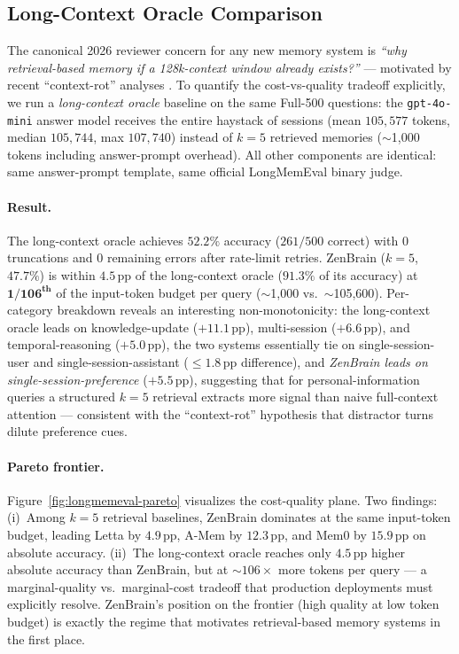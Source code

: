 \documentclass{article}
\begin{document}
\subsection{Long-Context Oracle Comparison}
\label{app:longmemeval-long-context}

The canonical 2026 reviewer concern for any new memory system is
\emph{``why retrieval-based memory if a 128k-context window already
exists?''} --- motivated by recent ``context-rot'' analyses
\citep{he2026memoryarena, yan2025gam}. To quantify the cost-vs-quality
tradeoff explicitly, we run a \emph{long-context oracle} baseline on
the same Full-500 questions: the \texttt{gpt-4o-mini} answer model
receives the entire haystack of sessions (mean $105{,}577$ tokens,
median $105{,}744$, max $107{,}740$) instead of $k{=}5$ retrieved
memories ($\sim$1{,}000 tokens including answer-prompt overhead). All
other components are identical: same answer-prompt template, same
official LongMemEval binary judge.

\paragraph{Result.} The long-context oracle achieves $\mathbf{52.2\%}$
accuracy ($261/500$ correct) with $0$ truncations and $0$ remaining
errors after rate-limit retries. ZenBrain ($k{=}5$, $47.7\%$) is
within $\mathbf{4.5}$\,pp of the long-context oracle ($\mathbf{91.3\%}$
of its accuracy) at $\mathbf{1/106^\text{th}}$ of the input-token
budget per query ($\sim$1{,}000 vs.\ $\sim$105{,}600). Per-category breakdown reveals an interesting non-monotonicity: the
long-context oracle leads on knowledge-update ($+11.1$\,pp),
multi-session ($+6.6$\,pp), and temporal-reasoning ($+5.0$\,pp), the
two systems essentially tie on single-session-user and
single-session-assistant ($\leq 1.8$\,pp difference), and \emph{ZenBrain
leads on single-session-preference} ($+5.5$\,pp), suggesting that for
personal-information queries a structured $k{=}5$ retrieval extracts
more signal than naive full-context attention --- consistent with the
``context-rot'' hypothesis that distractor turns dilute preference
cues.

\paragraph{Pareto frontier.} Figure~\ref{fig:longmemeval-pareto}
visualizes the cost-quality plane. Two findings:
(i)~Among $k{=}5$ retrieval baselines, ZenBrain dominates at the same
input-token budget, leading Letta by $4.9$\,pp, A-Mem by $12.3$\,pp,
and Mem0 by $15.9$\,pp on absolute accuracy.
(ii)~The long-context oracle reaches only $4.5$\,pp higher absolute
accuracy than ZenBrain, but at $\sim$$106\times$ more tokens per
query --- a marginal-quality vs.\ marginal-cost tradeoff that production
deployments must explicitly resolve. ZenBrain's position on the
frontier (high quality at low token budget) is exactly the regime that
motivates retrieval-based memory systems in the first place.
\end{document}
